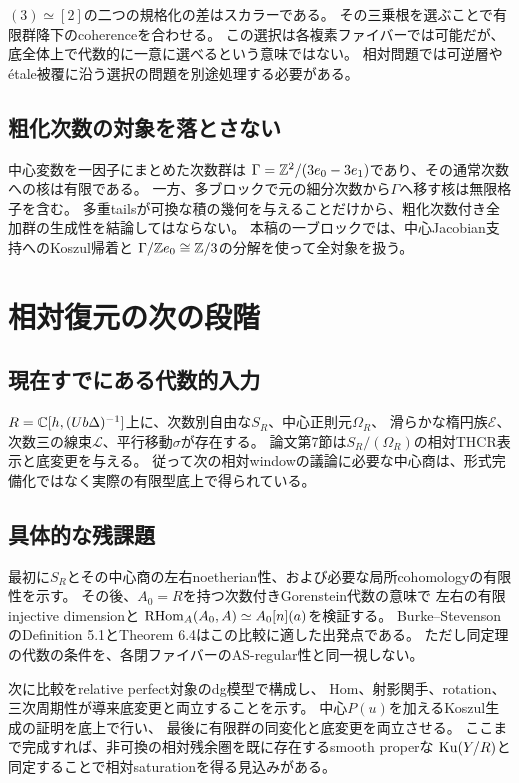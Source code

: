 $(3)\simeq[2]$の二つの規格化の差はスカラーである。
その三乗根を選ぶことで有限群降下のcoherenceを合わせる。
この選択は各複素ファイバーでは可能だが、底全体上で代数的に一意に選べるという意味ではない。
相対問題では可逆層やétale被覆に沿う選択の問題を別途処理する必要がある。

\subsection{粗化次数の対象を落とさない}
中心変数を一因子にまとめた次数群は
$\Gamma=\mathbb Z^2/(3e_0-3e_1)$であり、その通常次数への核は有限である。
一方、多ブロックで元の細分次数から$\Gamma$へ移す核は無限格子を含む。
多重tailsが可換な積の幾何を与えることだけから、粗化次数付き全加群の生成性を結論してはならない。
本稿の一ブロックでは、中心Jacobian支持へのKoszul帰着と
$\Gamma/\mathbb Z e_0\cong\mathbb Z/3$の分解を使って全対象を扱う。

\section{相対復元の次の段階}
\subsection{現在すでにある代数的入力}
$R=\mathbb C[h,(Ub\Delta)^{-1}]$上に、次数別自由な$S_R$、中心正則元$\Omega_R$、
滑らかな楕円族$\mathscr E$、次数三の線束$\mathcal L$、平行移動$\sigma$が存在する。
論文第7節は$S_R/(\Omega_R)$の相対THCR表示と底変更を与える。
従って次の相対windowの議論に必要な中心商は、形式完備化ではなく実際の有限型底上で得られている。

\subsection{具体的な残課題}
最初に$S_R$とその中心商の左右noetherian性、および必要な局所cohomologyの有限性を示す。
その後、$A_0=R$を持つ次数付きGorenstein代数の意味で
左右の有限injective dimensionと
$\operatorname{RHom}_A(A_0,A)\simeq A_0[n](a)$を検証する。
Burke--StevensonのDefinition 5.1とTheorem 6.4はこの比較に適した出発点である。
ただし同定理の代数の条件を、各閉ファイバーのAS-regular性と同一視しない。

次に比較をrelative perfect対象のdg模型で構成し、
Hom、射影関手、rotation、三次周期性が導来底変更と両立することを示す。
中心$P(u)$を加えるKoszul生成の証明を底上で行い、
最後に有限群の同変化と底変更を両立させる。
ここまで完成すれば、非可換の相対残余圏を既に存在するsmooth properな
$\operatorname{Ku}(Y/R)$と同定することで相対saturationを得る見込みがある。

